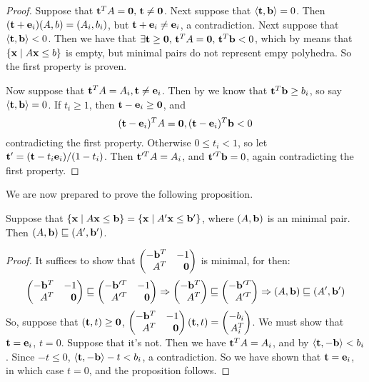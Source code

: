 \begin{proof}
	Suppose that $\mathbf{t}^T A = \mathbf{0},\, \mathbf{t}\neq\mathbf{0}$.  Next suppose that $\left\langle \mathbf{t}, \mathbf{b} \right\rangle = 0$.  Then $(\mathbf{t} + \mathbf{e}_i)(A,b) = (A_i,b_i)$, but $\mathbf{t}+\mathbf{e}_i \neq \mathbf{e}_i$, a contradiction.  Next suppose that ${\left\langle \mathbf{t}, \mathbf{b} \right\rangle < 0}$.  Then we have that $\exists \mathbf{t}\geq\mathbf{0},\,\mathbf{t}^T A = \mathbf{0},\,\mathbf{t}^T \mathbf{b} < 0$, which by  means that $\left\{\mathbf{x}\;|\; A\mathbf{x}\leq b\right\}$ is empty, but minimal pairs do not represent empy polyhedra.  So the first property is proven.

	Now suppose that $\mathbf{t}^T A = A_i, \mathbf{t}\neq\mathbf{e}_i$.  Then by  we know that $\mathbf{t}^T \mathbf{b} \geq b_i$, so say $\left\langle \mathbf{t}, \mathbf{b} \right\rangle = 0$.  If $t_i\geq 1$, then $\mathbf{t}-\mathbf{e}_i\geq \mathbf{0}$, and
	\[(\mathbf{t} - \mathbf{e}_i)^T A = \mathbf{0}, (\mathbf{t}-\mathbf{e}_i)^T\mathbf{b} < 0\]
	contradicting the first property.  Otherwise $0\leq t_i < 1$, so let $\mathbf{t}' = (\mathbf{t}-t_i\mathbf{e}_i)/(1-t_i)$.  Then $\mathbf{t}'^T A = A_i$, and $\mathbf{t}'^T\mathbf{b} = 0$, again contradicting the first property.
\end{proof}

We are now prepared to prove the following proposition.

\begin{Prop}\label{minimal_Ab}
	Suppose that $\left\{\mathbf{x}\;|\; A\mathbf{x}\leq \mathbf{b}\right\} = \left\{\mathbf{x}\;|\; A'\mathbf{x}\leq \mathbf{b}'\right\}$, where $(A,\mathbf{b})$ is an minimal pair.  Then $(A,\mathbf{b}) \sqsubseteq (A',\mathbf{b}')$.
\end{Prop}

\begin{proof}
	It suffices to show that $\pmb -\b^T & -1 \\ A^T & \0 \pme$ is minimal, for then:
	\[\pmb -\b^T & -1 \\ A^T & \0 \pme \sqsubseteq \pmb -\b'^T & -1 \\ A'^T & \0 \pme \Rightarrow
		\pmb -\b^T \\ A^T \pme \sqsubseteq \pmb -\b'^T \\ A'^T \pme \Rightarrow
		(A,\b) \sqsubseteq (A',\b')
	\]
	So, suppose that $(\mathbf{t},t) \geq \mathbf{0}$, $\pmb -\b^T & -1 \\ A^T & \0 \pme(\t,t) = \pmb -b_i \\ A^T_i\pme$.  We must show that $\mathbf{t} = \mathbf{e}_i$, $t = 0$.  Suppose that it's not.  Then we have $\mathbf{t}^T A = A_i$, and by  $\left\langle \mathbf{t}, -\mathbf{b} \right\rangle < b_i$.  Since $-t \leq 0$, $\left\langle \mathbf{t}, -\mathbf{b} \right\rangle - t < b_i$, a contradiction.  So we have shown that $\mathbf{t} = \mathbf{e}_i$, in which case $t = 0$, and the proposition follows.
\end{proof}

